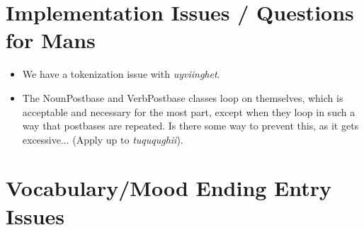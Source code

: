 \documentclass{article}
\begin{document}

\section{Implementation Issues / Questions for Mans}

\begin{itemize}
\renewcommand\labelitemi{$\cdot$}

\item We have a tokenization issue with \textit{uyviinghet}.

\item The NounPostbase and VerbPostbase classes loop on themselves, which is acceptable and necessary for the most part, except when they loop in such a way that postbases are repeated.
%
Is there some way to prevent this, as it gets excessive... (Apply up to \textit{tuququghii}).

\end{itemize}


\section{Vocabulary/Mood Ending Entry Issues}
\end{document}
